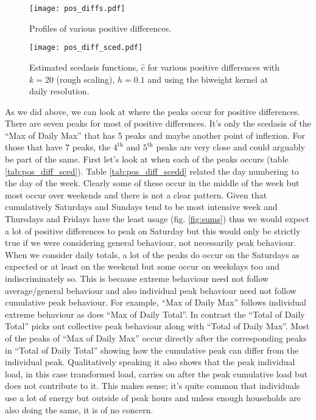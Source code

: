 \begin{figure}
\centering
\texttt{[image: pos\_diffs.pdf]}
\caption{\label{fig:pos_diff} Profiles of various positive differences.}
\end{figure}

\begin{figure}
\centering
\texttt{[image: pos\_diff\_sced.pdf]}
\caption{\label{fig:pos_diff_sced} Estimated scedasis functions, $\hat{c}$ for various positive differences with $k=20$ (rough scaling), $h=0.1$ and using the biweight kernel at daily resolution.}
\end{figure}

As we did above, we can look at where the peaks occur for positive differences. There are seven peaks for most of positive differences. It's only the scedasis of the ``Max of Daily Max'' that has 5 peaks and maybe another point of inflexion. For those that have 7 peaks, the $4^{\text{th}}$ and $5^{\text{th}}$ peaks are very close and could arguably be part of the same. First let's look at when each of the peaks occurs (table \ref{tab:pos_diff_sced}). Table \ref{tab:pos_diff_scedd} related the day numbering to the day of the week. Clearly some of these occur in the middle of the week but most occur over weekends and there is not a clear pattern. Given that cumulatively Saturdays and Sundays tend to be most intensive week and Thursdays and Fridays have the least usage (fig. \ref{fig:sums}) thus we would expect a lot of positive differences to peak on Saturday but this would only be strictly true if we were considering general behaviour, not necessarily peak behaviour. When we consider daily totals, a lot of the peaks do occur on the Saturdays as expected or at least on the weekend but some occur on weekdays too and indiscriminately so. This is because extreme behaviour need not follow average/general behaviour and also individual peak behaviour need not follow cumulative peak behaviour.  For example, ``Max of Daily Max'' follows individual extreme behaviour as does ``Max of Daily Total''. In contrast the ``Total of Daily Total'' picks out collective peak behaviour along with ``Total of Daily Max''. Most of the peaks of ``Max of Daily Max'' occur directly after the corresponding peaks in ``Total of Daily Total'' showing how the cumulative peak can differ from the individual peak. Qualitatively speaking it also shows that the peak individual load, in this case transformed load, carries on after the peak cumulative load but does not contribute to it. This makes sense; it's quite common that individuals use a lot of energy but outside of peak hours and unless enough households are also doing the same, it is of no concern.


